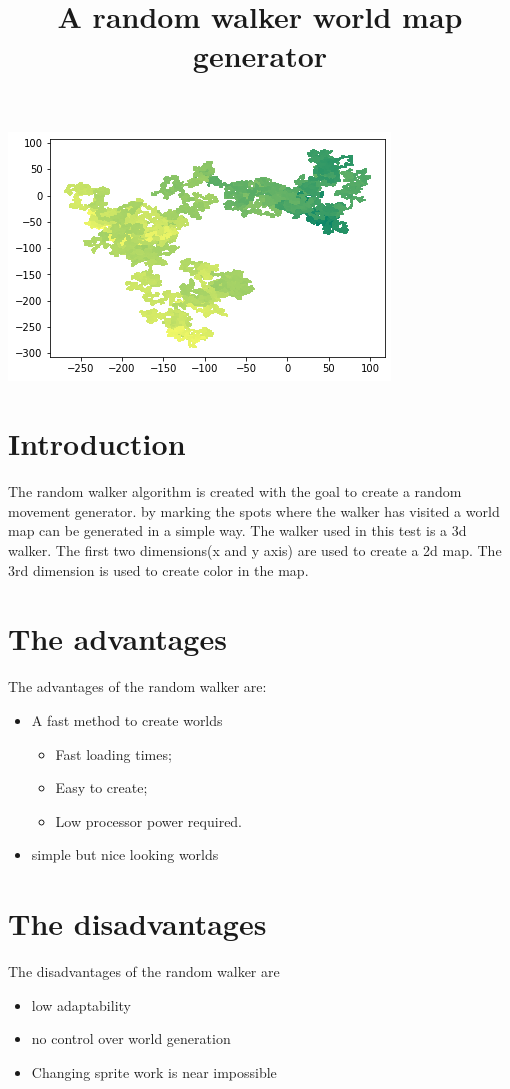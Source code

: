 \documentclass[8pt,letterpaper]{article}
\begin{document}
\title{A random walker world map generator}
\maketitle

\includegraphics{Images/random_walker_world.png}
\newpage{}
\section{Introduction}
The random walker algorithm is created with the goal to create a random movement generator. by marking the spots where the walker has visited a world map can be generated in a simple way. The walker used in this test is a 3d walker. The first two dimensions(x and y axis) are used to create a 2d map. The 3rd dimension is used to create color in the map.
\section{The advantages}
The advantages of the random walker are:
\begin{itemize}
    \item A fast method to create worlds
        \begin{itemize}
        \item Fast loading times;
        \item Easy to create;
        \item Low processor power required.
        \end{itemize}
    \item simple but nice looking worlds
\end{itemize}
\section{The disadvantages}
The disadvantages of the random walker are
\begin{itemize}
    \item low adaptability
    \item no control over world generation
    \item Changing sprite work is near impossible
\end{itemize}
\end{document}
